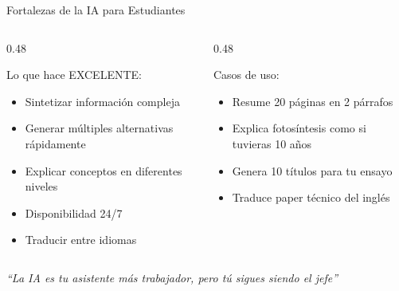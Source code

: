 \documentclass[aspectratio=169,xcolor={dvipsnames}]{beamer}
\begin{document}
	\begin{frame}{Fortalezas de la IA para Estudiantes}
		
		\begin{columns}[T]
			\begin{column}{0.48\textwidth}
				\begin{block}{Lo que hace EXCELENTE:}
					\begin{itemize}
						\item Sintetizar información compleja
						\item Generar múltiples alternativas rápidamente
						\item Explicar conceptos en diferentes niveles
						\item Disponibilidad 24/7
						\item Traducir entre idiomas
					\end{itemize}
				\end{block}
			\end{column}
			
			\begin{column}{0.48\textwidth}
				\begin{exampleblock}{Casos de uso:}
					\begin{itemize}
						\item Resume 20 páginas en 2 párrafos
						\item Explica fotosíntesis como si tuvieras 10 años
						\item Genera 10 títulos para tu ensayo
						\item Traduce paper técnico del inglés
					\end{itemize}
				\end{exampleblock}
			\end{column}
		\end{columns}
		
		\vspace{0.5cm}
		
		\begin{center}
			\textit{``La IA es tu asistente más trabajador, pero tú sigues siendo el jefe''}
		\end{center}
		
	\end{frame}
	
\end{document}
